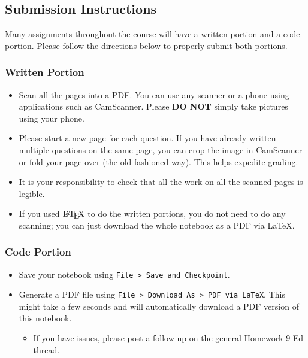\documentclass[11pt]{article}
\providecommand{\tightlist}{%
      \setlength{\itemsep}{0pt}\setlength{\parskip}{0pt}}
\let\Oldlatex\LaTeX
\renewcommand{\LaTeX}{\textrm{\Oldlatex}}
\begin{document}
    \subsection{Submission Instructions}\label{submission-instructions}

Many assignments throughout the course will have a written portion and a
code portion. Please follow the directions below to properly submit both
portions.

\subsubsection{Written Portion}\label{written-portion}

\begin{itemize}
\tightlist
\item
  Scan all the pages into a PDF. You can use any scanner or a phone
  using applications such as CamScanner. Please \textbf{DO NOT} simply
  take pictures using your phone.
\item
  Please start a new page for each question. If you have already written
  multiple questions on the same page, you can crop the image in
  CamScanner or fold your page over (the old-fashioned way). This helps
  expedite grading.
\item
  It is your responsibility to check that all the work on all the
  scanned pages is legible.
\item
  If you used \(\LaTeX\) to do the written portions, you do not need to
  do any scanning; you can just download the whole notebook as a PDF via
  LaTeX.
\end{itemize}

\subsubsection{Code Portion}\label{code-portion}

\begin{itemize}
\tightlist
\item
  Save your notebook using
  \texttt{File\ \textgreater{}\ Save\ and\ Checkpoint}.
\item
  Generate a PDF file using
  \texttt{File\ \textgreater{}\ Download\ As\ \textgreater{}\ PDF\ via\ LaTeX}.
  This might take a few seconds and will automatically download a PDF
  version of this notebook.

  \begin{itemize}
  \tightlist
  \item
    If you have issues, please post a follow-up on the general Homework
    9 Ed thread.
  \end{itemize}
\end{itemize}
\end{document}
